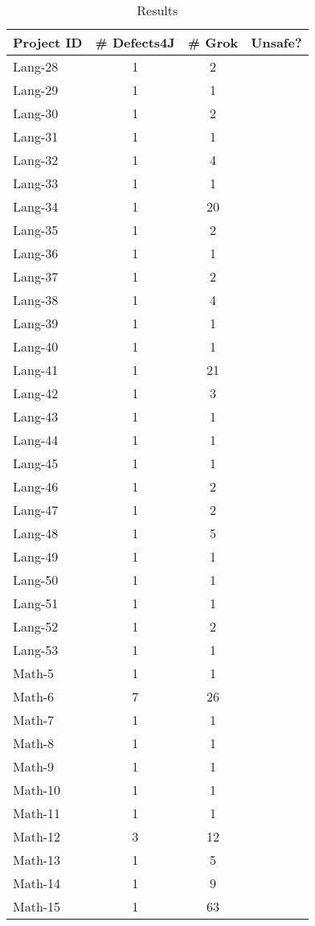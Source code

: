 \begin{footnotesize}
\centering
\begin{longtable}{lccc}
\caption{Results}
\label{tab:rts-result-num}\\ \toprule
\textbf{Project ID}  & \textbf{\# Defects4J} & \textbf{\# Grok} & \textbf{Unsafe?} \\ \midrule
Lang-28 & 1 & 2 & \\
Lang-29 & 1 & 1 & \\
Lang-30 & 1 & 2 & \\
Lang-31 & 1 & 1 & \\
Lang-32 & 1 & 4 & \\
Lang-33 & 1 & 1 & \\
Lang-34 & 1 & 20 & \\
Lang-35 & 1 & 2 & \\
Lang-36 & 1 & 1 & \\
Lang-37 & 1 & 2 & \\
Lang-38 & 1 & 4 & \\
Lang-39 & 1 & 1 & \\
Lang-40 & 1 & 1 & \\
Lang-41 & 1 & 21 & \\
Lang-42 & 1 & 3 & \\
Lang-43 & 1 & 1 & \\
Lang-44 & 1 & 1 & \\
Lang-45 & 1 & 1 & \\
Lang-46 & 1 & 2 & \\
Lang-47 & 1 & 2 & \\
Lang-48 & 1 & 5 & \\
Lang-49 & 1 & 1 & \\
Lang-50 & 1 & 1 & \\
Lang-51 & 1 & 1 & \\
Lang-52 & 1 & 2 & \\
Lang-53 & 1 & 1 & \\
Math-5 & 1 & 1 & \\
Math-6 & 7 & 26 & \\
Math-7 & 1 & 1 & \\
Math-8 & 1 & 1 & \\
Math-9 & 1 & 1 & \\
Math-10 & 1 & 1 & \\
Math-11 & 1 & 1 & \\
Math-12 & 3 & 12 & \\
Math-13 & 1 & 5 & \\
Math-14 & 1 & 9 & \\
Math-15 & 1 & 63 & \\

\end{longtable}
\end{footnotesize}
